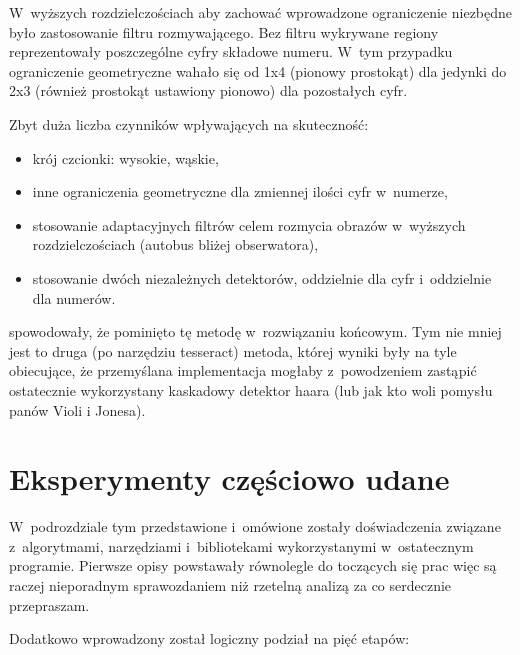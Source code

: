 W~wyższych rozdzielczościach aby zachować wprowadzone ograniczenie
niezbędne było zastosowanie filtru rozmywającego. Bez filtru
wykrywane regiony reprezentowały poszczególne cyfry składowe numeru.
W~tym przypadku ograniczenie geometryczne wahało się od 1x4 (pionowy
prostokąt) dla jedynki do 2x3 (również prostokąt ustawiony pionowo) dla
pozostałych cyfr.

Zbyt duża liczba czynników wpływających na skuteczność:
\begin{itemize}
    \item krój czcionki: wysokie, wąskie,
    \item inne ograniczenia geometryczne dla zmiennej ilości cyfr
        w~numerze,
    \item stosowanie adaptacyjnych filtrów celem rozmycia obrazów
        w~wyższych rozdzielczościach (autobus bliżej obserwatora),
    \item stosowanie dwóch niezależnych detektorów, oddzielnie dla
        cyfr i~oddzielnie dla numerów.
\end{itemize}

spowodowały, że pominięto tę metodę w~rozwiązaniu końcowym.
Tym nie mniej jest to druga (po narzędziu tesseract) metoda, której
wyniki były na tyle obiecujące, że przemyślana implementacja
mogłaby z~powodzeniem zastąpić ostatecznie wykorzystany kaskadowy
detektor haara (lub jak kto woli pomysłu panów Violi i Jonesa).


\section{Eksperymenty częściowo udane}

W~podrozdziale tym przedstawione i~omówione zostały doświadczenia
związane z~algorytmami, narzędziami i~bibliotekami wykorzystanymi
w~ostatecznym programie. Pierwsze opisy powstawały równolegle
do toczących się prac więc są raczej nieporadnym sprawozdaniem
niż rzetelną analizą za co serdecznie przepraszam.

Dodatkowo wprowadzony został logiczny podział na pięć etapów:

